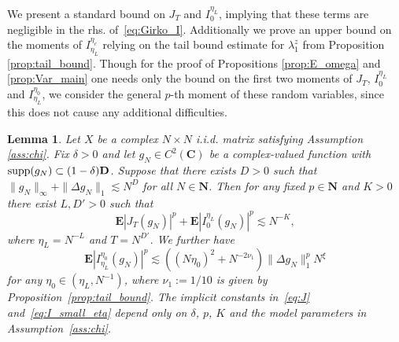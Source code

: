 \documentclass[10pt]{amsart}
\newtheorem{lemma}[theorem]{Lemma}
\numberwithin{equation}{section}
\newcommand{\E}{\mathbf{E}}
\newcommand{\C}{\mathbf{C}}
\newcommand{\N}{\mathbf{N}}
\begin{document}
We present a standard bound on $J_T$ and $I_0^{\eta_L}$, implying that these terms are negligible in the rhs. of~\eqref{eq:Girko_I}. Additionally we prove an upper bound on the moments of $I_{\eta_L}^{\eta_c}$ relying on the tail bound estimate for $\lambda_1^z$ from Proposition \ref{prop:tail_bound}. Though for the proof of Propositions \ref{prop:E_omega} and \ref{prop:Var_main} one needs only the bound on the first two moments of $J_T$, $I_0^{\eta_L}$ and $I_{\eta_L}^{\eta_0}$, we consider the general $p$-th moment of these random variables, since this does not cause any additional difficulties.
\begin{lemma}\label{lem:Girko_reduction} Let $X$ be a complex $N\times N$ i.i.d. matrix satisfying Assumption \ref{ass:chi}. Fix $\delta>0$ and let $g_N\in C^2(\C)$ be a complex-valued function with ${\rm{supp}}(g_N)\subset (1-\delta)\mathbf{D}$. Suppose that there exists $D>0$ such that $\|g_N\|_\infty\!+\|\Delta g_N\|_1\lesssim N^{D}$ for all $N\in\N$. Then for any fixed $p\in\N$ and $K>0$ there exist $L,D'>0$ such that
\begin{equation}
\E |J_T(g_N)|^p + \E |I_0^{\eta_L}(g_N)|^p \lesssim N^{-K},
\label{eq:J}
\end{equation}
where $\eta_L=N^{-L}$ and $T=N^{D'}$. We further have
\begin{equation}
\E\left\vert I_{\eta_L}^{\eta_0}(g_N)\right\vert^p \lesssim \left((N\eta_0)^2 + N^{-2\nu_1}\right) \|\Delta g_N\|_1^pN^\xi \label{eq:I_small_eta}
\end{equation}
for any $\eta_0\in (\eta_L,N^{-1})$, where $\nu_1:=1/10$ is given by Proposition~\ref{prop:tail_bound}. The implicit constants in~\eqref{eq:J} and~\eqref{eq:I_small_eta} depend only on $\delta$, $p$, $K$ and the model parameters in Assumption~\ref{ass:chi}.
\end{lemma}
\end{document}

